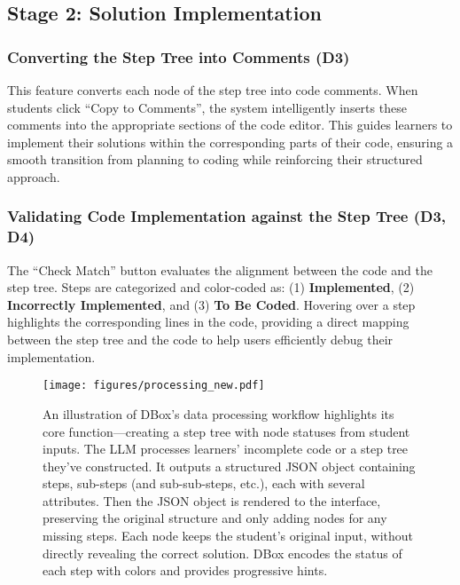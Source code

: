

\subsection{Stage 2: Solution Implementation}

\subsubsection{Converting the Step Tree into Comments (D3)} This feature converts each node of the step tree into code comments. When students click ``Copy to Comments'', the system intelligently inserts these comments into the appropriate sections of the code editor. This guides learners to implement their solutions within the corresponding parts of their code, ensuring a smooth transition from planning to coding while reinforcing their structured approach.

\subsubsection{Validating Code Implementation against the Step Tree (D3, D4)} The ``Check Match'' button evaluates the alignment between the code and the step tree. Steps are categorized and color-coded as: (1) \textbf{Implemented}, (2) \textbf{Incorrectly Implemented}, and (3) \textbf{To Be Coded}. Hovering over a step highlights the corresponding lines in the code, providing a direct mapping between the step tree and the code to help users efficiently debug their implementation.


\begin{figure*}[htbp]
	\centering 
	\texttt{[image: figures/processing\_new.pdf]}
	\caption{An illustration of DBox's data processing workflow highlights its core function—creating a step tree with node statuses from student inputs. The LLM processes learners' incomplete code or a step tree they’ve constructed. It outputs a structured JSON object containing steps, sub-steps (and sub-sub-steps, etc.), each with several attributes. Then the JSON object is rendered to the interface, preserving the original structure and only adding nodes for any missing steps. Each node keeps the student's original input, without directly revealing the correct solution. DBox encodes the status of each step with colors and provides progressive hints.}
 
	\label{fig:processing}
        \Description{}
\end{figure*}

